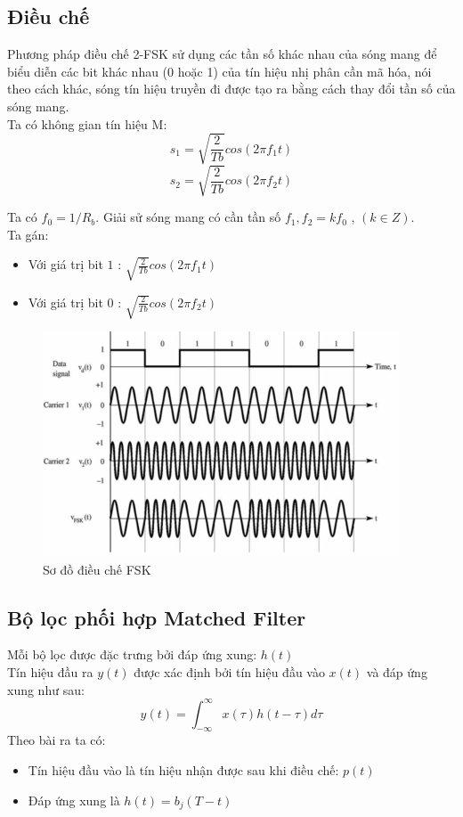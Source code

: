 \subsection{Điều chế}
    Phương pháp điều chế 2-FSK sử dụng các tần số khác nhau của sóng mang để biểu diễn các bit khác nhau (0 hoặc 1) của tín hiệu nhị phân cần mã hóa, nói theo cách khác, sóng tín hiệu truyền đi được tạo ra bằng cách thay đổi tần số của sóng mang.\\
Ta có không gian tín hiệu M:
\[ s_1 = \sqrt{\frac{2}{Tb}} cos(2 \pi f_1 t) \]
\[ s_2 = \sqrt{\frac{2}{Tb}} cos(2 \pi f_2 t) \]

Ta có $f_0 = 1/R_b$. Giải sử sóng mang có cần tần số $f_1, f_2 = kf_0$ , $( k \in Z)$.\\
Ta gán: \\
\begin{itemize}
\item Với giá trị bit $1$ : $\sqrt{\frac{2}{Tb}} cos(2 \pi f_1 t)$
\item Với giá trị bit $0$ : $\sqrt{\frac{2}{Tb}} cos(2 \pi f_2 t)$
\end{itemize}
	
\begin{center}
    \begin{figure}[htp]
    \begin{center}
     \includegraphics[scale=1]{Img/dieu_che_fsk.png}
    \end{center}
    \caption{Sơ đồ điều chế FSK}
    \label{refhinh1}
    \end{figure}
\end{center}


\subsection{Bộ lọc phối hợp Matched Filter}

Mỗi bộ lọc được đặc trưng bởi đáp ứng xung: $h(t)$ \\
Tín hiệu đầu ra $y(t)$ được xác định bởi tín hiệu đầu vào $x(t)$ và đáp ứng xung như sau:
\[ y(t) = \displaystyle \int_{-\infty}^{\infty} x(\tau)h(t - \tau) d \tau  \]
Theo bài ra ta có: \\
\begin{itemize}
\item Tín hiệu đầu vào là tín hiệu nhận được sau khi điều chế: $p(t)$
\item Đáp ứng xung là $h(t) = b_j(T-t)$
\end{itemize}


